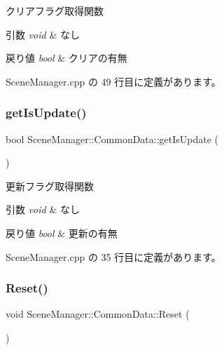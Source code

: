 クリアフラグ取得関数 


\begin{DoxyParams}{引数}
{\em void} & なし \\
\hline
\end{DoxyParams}

\begin{DoxyRetVals}{戻り値}
{\em bool} & クリアの有無 \\
\hline
\end{DoxyRetVals}


 Scene\+Manager.\+cpp の 49 行目に定義があります。

\mbox{\label{class_scene_manager_1_1_common_data_a2e9f26617f0f0ce25b7c2c99fdfadb9c}} 
\subsubsection{\texorpdfstring{get\+Is\+Update()}{getIsUpdate()}}
{\footnotesize\ttfamily bool Scene\+Manager\+::\+Common\+Data\+::get\+Is\+Update (\begin{DoxyParamCaption}{ }\end{DoxyParamCaption})}



更新フラグ取得関数 


\begin{DoxyParams}{引数}
{\em void} & なし \\
\hline
\end{DoxyParams}

\begin{DoxyRetVals}{戻り値}
{\em bool} & 更新の有無 \\
\hline
\end{DoxyRetVals}


 Scene\+Manager.\+cpp の 35 行目に定義があります。

\mbox{\label{class_scene_manager_1_1_common_data_a32823be65c187b909e4159cef57931a9}} 
\subsubsection{\texorpdfstring{Reset()}{Reset()}}
{\footnotesize\ttfamily void Scene\+Manager\+::\+Common\+Data\+::\+Reset (\begin{DoxyParamCaption}{ }\end{DoxyParamCaption})\hspace{0.3cm}{\ttfamily [inline]}}



